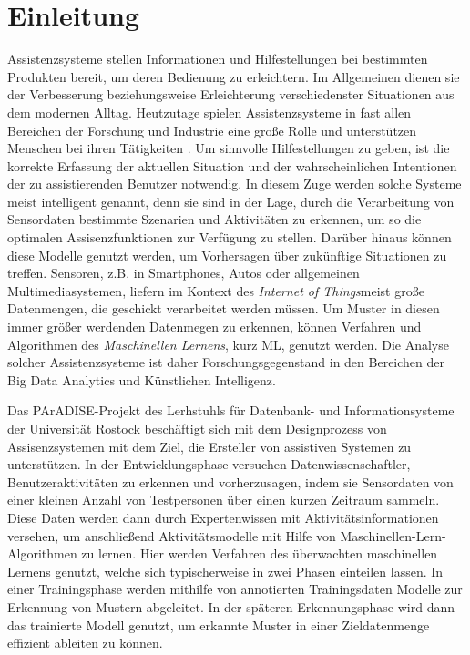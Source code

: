 \chapter{Einleitung}
\label{kap:intro}
Assistenzsysteme stellen Informationen und Hilfestellungen bei bestimmten Produkten bereit, um deren Bedienung zu erleichtern. Im Allgemeinen dienen sie der Verbesserung beziehungsweise Erleichterung verschiedenster Situationen aus dem modernen Alltag.
Heutzutage spielen Assistenzsysteme in fast allen Bereichen der Forschung und Industrie eine große Rolle und unterstützen Menschen bei ihren Tätigkeiten \cite{winner2014handbook, kurihata2005rainy, omerdic2011design}. Um sinnvolle Hilfestellungen zu geben, ist die korrekte Erfassung der aktuellen Situation und
der wahrscheinlichen Intentionen der zu assistierenden Benutzer notwendig. 
In diesem Zuge werden solche Systeme meist intelligent genannt, denn sie sind in der Lage, durch die Verarbeitung von Sensordaten bestimmte Szenarien und Aktivitäten zu erkennen, um so die optimalen Assisenzfunktionen zur Verfügung zu stellen. Darüber hinaus können diese Modelle genutzt werden, um Vorhersagen über zukünftige Situationen zu treffen.
Sensoren, z.B. in Smartphones, Autos oder allgemeinen Multimediasystemen, liefern im Kontext des \textit{Internet of Things}\cite{xia2012internet, wortmann2015internet}meist große Datenmengen, die geschickt verarbeitet werden müssen. Um Muster in diesen immer größer werdenden Datenmegen zu erkennen, können Verfahren und Algorithmen des \textit{Maschinellen Lernens}\cite{Goodfellow-et-al-2016}, kurz ML, genutzt werden. Die Analyse solcher Assistenzsysteme ist daher Forschungsgegenstand in den Bereichen der Big Data Analytics\cite{d2019big} und Künstlichen Intelligenz. 

Das PArADISE-Projekt\cite{paradise} des Lerhstuhls für Datenbank- und Informationsysteme der Universität Rostock beschäftigt sich mit dem Designprozess von Assisenzsystemen mit dem Ziel, die Ersteller von assistiven Systemen zu unterstützen. In der Entwicklungsphase versuchen Datenwissenschaftler, Benutzeraktivitäten zu erkennen und vorherzusagen, indem sie Sensordaten von einer kleinen Anzahl von Testpersonen über einen kurzen Zeitraum sammeln. Diese Daten werden dann durch Expertenwissen mit Aktivitätsinformationen versehen, um anschließend Aktivitätsmodelle mit Hilfe von Maschinellen-Lern-Algorithmen zu lernen. Hier werden Verfahren des überwachten maschinellen Lernens genutzt, welche sich typischerweise in zwei Phasen einteilen lassen. In einer Trainingsphase werden mithilfe von annotierten Trainingsdaten Modelle zur Erkennung von Mustern abgeleitet. In der späteren Erkennungsphase wird dann das
trainierte Modell genutzt, um erkannte Muster in einer Zieldatenmenge effizient ableiten
zu können. 
